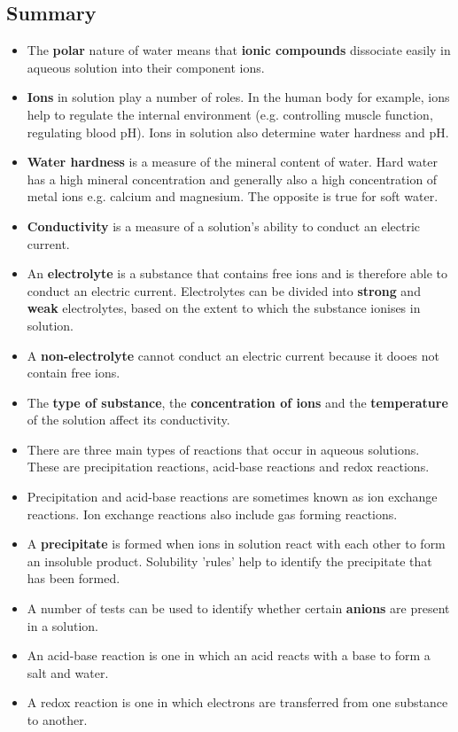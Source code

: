             \subsection{ Summary}
            \nopagebreak
            \label{m38719*eip-903}\begin{itemize}[noitemsep]
            \label{m38719*uid95}\item The \textbf{polar} nature of water means that \textbf{ionic compounds} dissociate easily in aqueous solution into their component ions.
\label{m38719*uid96}\item \textbf{Ions} in solution play a number of roles. In the human body for example, ions help to regulate the internal environment (e.g. controlling muscle function, regulating blood pH). Ions in solution also determine water hardness and pH.
\label{m38719*uid97}\item \textbf{Water hardness} is a measure of the mineral content of water. Hard water has a high mineral concentration and generally also a high concentration of metal ions e.g. calcium and magnesium. The opposite is true for soft water.
\label{m38719*uid100}\item \textbf{Conductivity} is a measure of a solution's ability to conduct an electric current.
\label{m38719*uid101}\item An \textbf{electrolyte} is a substance that contains free ions and is therefore able to conduct an electric current. Electrolytes can be divided into \textbf{strong} and \textbf{weak} electrolytes, based on the extent to which the substance ionises in solution.
\label{m38719*uid102}\item A \textbf{non-electrolyte} cannot conduct an electric current because it dooes not contain free ions.
\label{m38719*uid103}\item The \textbf{type of substance}, the \textbf{concentration of ions} and the \textbf{temperature} of the solution affect its conductivity.
\label{m38719*uid0253}\item There are three main types of reactions that occur in aqueous solutions. These are precipitation reactions, acid-base reactions and redox reactions.
\label{m38719*uid8923}\item 
Precipitation and acid-base reactions are sometimes known as ion exchange reactions. Ion exchange reactions also include gas forming reactions.
\label{m38719*uid104}\item A \textbf{precipitate} is formed when ions in solution react with each other to form an insoluble product. Solubility 'rules' help to identify the precipitate that has been formed.
\label{m38719*uid105}\item A number of tests can be used to identify whether certain \textbf{anions} are present in a solution.
\label{m38719*id813}\item An acid-base reaction is one in which an acid reacts with a base to form a salt and water.
\label{m38719*uid823}\item A redox reaction is one in which electrons are transferred from one substance to another. 
\end{itemize}
\label{m38719*eip-896}

